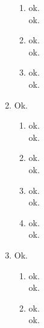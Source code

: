 \documentclass[11pt]{article}
\begin{document}
\begin{enumerate}[label=\arabic*.]
\begin{enumerate}[label=(\alph*)]
\item
ok.
\vspace*{1\baselineskip}
\\
ok.




\item
ok.
\vspace*{1\baselineskip}
\\
ok.






\item
ok.
\vspace*{1\baselineskip}
\\
ok.

\end{enumerate}



\newpage
\item
Ok.
\begin{enumerate}[label=(\alph*)]
\item
ok.
\vspace*{1\baselineskip}
\\
ok.



\item
ok.
\vspace*{1\baselineskip}
\\
ok.





\item
ok.
\vspace*{1\baselineskip}
\\
ok.





\item
ok.
\vspace*{1\baselineskip}
\\
ok.
\end{enumerate}




\newpage
\item
Ok.
\begin{enumerate}[label=(\alph*)]
\item
ok.
\vspace*{1\baselineskip}
\\
ok.



\item
ok.
\vspace*{1\baselineskip}
\\
ok.






\end{enumerate}
\end{enumerate}
\end{document}
